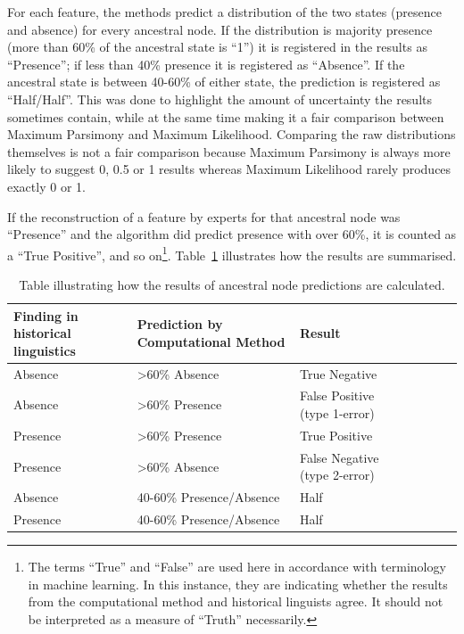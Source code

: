 \documentclass[a4paper,10pt]{article} %
\begin{document}

For each feature, the methods predict a distribution of the two states (presence and absence) for every ancestral node. If the distribution is majority presence (more than 60\% of the ancestral state is ``1'') it is registered in the results as ``Presence''; if less than 40\% presence it is registered as ``Absence''. If the ancestral state is between 40-60\% of either state, the prediction is registered as ``Half/Half''. This was done to highlight the amount of uncertainty the results sometimes contain, while at the same time making it a fair comparison between Maximum Parsimony and Maximum Likelihood. Comparing the raw distributions themselves is not a fair comparison because Maximum Parsimony is always more likely to suggest 0, 0.5 or 1 results whereas Maximum Likelihood rarely produces exactly 0 or 1. 

If the reconstruction of a feature by experts for that ancestral node was ``Presence'' and the algorithm did predict presence with over 60\%, it is counted as a ``True Positive'', and so on\footnote{The terms ``True'' and ``False'' are used here in accordance with terminology in machine learning. In this instance, they are indicating whether the results from the computational method and historical linguists agree. It should not be interpreted as a measure of ``Truth'' necessarily.}. Table~\ref{example_HL_prediction_table_true_positives} illustrates how the results are summarised.

\begin{table}[H]
\centering
\caption{Table illustrating how the results of ancestral node predictions are calculated.}
\label{example_HL_prediction_table_true_positives}
\begin{tabular}{|l|l|l|l|l|l|l|l|}
\hline
\textbf{Finding in historical linguistics} & \textbf{Prediction by Computational Method} & \textbf{Result} \\ \hline
Absence & >60\% Absence & True Negative \\ \hline
Absence & >60\% Presence & False Positive (type 1-error) \\ \hline
Presence & >60\% Presence & True Positive \\ \hline
Presence & >60\% Absence & False Negative (type 2-error) \\ \hline
Absence & 40-60\% Presence/Absence & Half \\ \hline
Presence & 40-60\% Presence/Absence & Half\\ \hline
\end{tabular}
\end{table}
\end{document}
